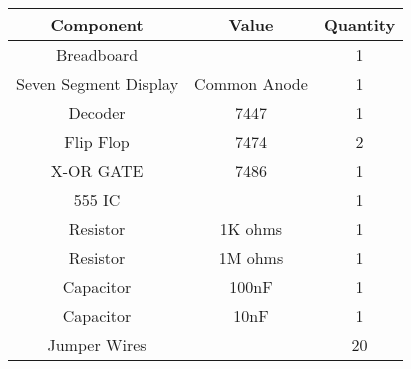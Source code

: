 \begin{tabular}{|c|c|c|}
\hline
Component		&Value	 	&Quantity\\
\hline
Breadboard		&	&1\\
\hline
Seven Segment Display			&Common Anode	&1\\
\hline
Decoder		&7447		&1\\
\hline
Flip Flop	&7474		&2\\
\hline
X-OR GATE		&7486		&1\\
\hline
555 IC	&		&1\\
\hline
Resistor		& 1K ohms	&1\\
\hline
Resistor		&1M ohms		&1\\
\hline
Capacitor		&100nF		&1\\
\hline
Capacitor		&10nF		&1\\
\hline
Jumper Wires	&			&20\\
\hline
\end{tabular}
